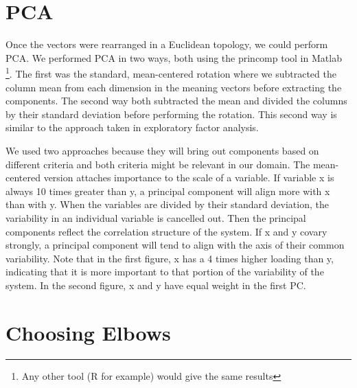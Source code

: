 \documentclass[eric_thesis.tex]{subfiles}
\begin{document}
\section{PCA}

Once the vectors were rearranged in a Euclidean topology, we could perform PCA. 
We performed PCA in two ways, both using the princomp tool in Matlab \footnote{Any other tool (R for example) would give the same 
results}. The first was the standard, mean-centered rotation where we subtracted 
the column mean from each dimension in the meaning vectors before extracting the 
components. The second way both subtracted the mean and divided the columns by 
their standard deviation before performing the rotation. This second way is 
similar to the approach taken in exploratory factor analysis. 

We used two approaches because they will bring out components based on different 
criteria and both criteria might be relevant in our domain. The mean-centered 
version attaches importance to the scale of a variable. If variable x is always 
10 times greater than y, a principal component will align more with x than with 
y.  When the variables are divided by their standard 
deviation, the variability in an individual variable is cancelled out. Then the 
principal components reflect the correlation structure of the system. If x and y 
covary strongly, a principal component will tend to align with the axis of their 
common variability.   Note that in 
 the first figure, x has a 4 times higher loading than y, 
indicating that it is more important to that portion of the variability of the 
system. In  the second figure, x and y have equal weight in 
the first PC.

\section{Choosing Elbows}
\end{document}
